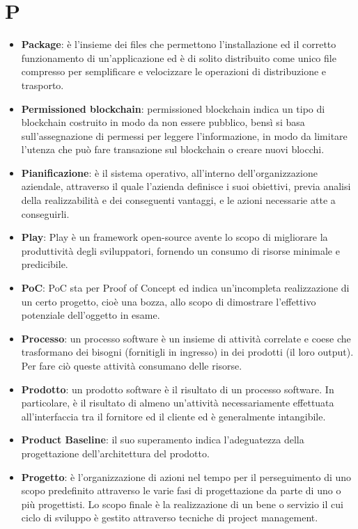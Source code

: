 \documentclass[a4paper, oneside, openany, dvipsnames, table]{article}
\begin{document}
\section{P}
\begin{itemize}
\item \textbf{Package}: è l'insieme dei files che permettono l'installazione ed il corretto funzionamento di un'applicazione ed è di solito distribuito come unico file compresso per semplificare e velocizzare le operazioni di distribuzione e trasporto.
\item \textbf{Permissioned blockchain}: permissioned blockchain indica un tipo di blockchain costruito in modo da non essere pubblico, bensì si basa sull'assegnazione di permessi per leggere l'informazione, in modo da limitare l'utenza che può fare transazione sul blockchain o creare nuovi blocchi.
\item \textbf{Pianificazione}: è il sistema operativo, all'interno dell'organizzazione aziendale, attraverso il quale l'azienda definisce i suoi obiettivi, previa analisi della realizzabilità e dei conseguenti vantaggi, e le azioni necessarie atte a conseguirli.
\item \textbf{Play}: Play è un framework open-source avente lo scopo di migliorare la produttività degli sviluppatori, fornendo un consumo di risorse minimale e predicibile.
\item \textbf{PoC}: PoC sta per Proof of Concept ed indica un'incompleta realizzazione di un certo progetto, cioè una bozza, allo scopo di dimostrare l'effettivo potenziale dell'oggetto in esame.
\item \textbf{Processo}: un processo software è un insieme di attività correlate e coese che trasformano dei bisogni (fornitigli in ingresso) in dei prodotti (il loro output).
Per fare ciò queste attività consumano delle risorse.%
\item \textbf{Prodotto}: un prodotto software è il risultato di un processo software. In particolare, è il risultato di almeno un'attività necessariamente effettuata all’interfaccia tra il fornitore ed il cliente ed è generalmente intangibile.
\item \textbf{Product Baseline}: il suo superamento indica l'adeguatezza della progettazione dell'architettura del prodotto.
\item \textbf{Progetto}: è l'organizzazione di azioni nel tempo per il perseguimento di uno scopo predefinito attraverso le varie fasi di progettazione da parte di uno o più progettisti. Lo scopo finale è la realizzazione di un bene o servizio il cui ciclo di sviluppo è gestito attraverso tecniche di project management.

\end{itemize}
\end{document}
